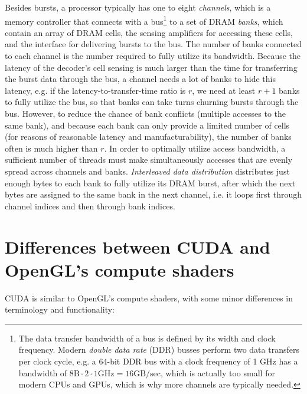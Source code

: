 \documentclass[table, xcdraw]{article}%
\begin{document}
Besides bursts, a processor typically has one to eight \emph{channels}, which is a memory controller that connects with a bus\footnote{The data transfer bandwidth of a bus is defined by its width and clock frequency. Modern \emph{double data rate} (DDR) busses perform two data transfers per clock cycle, e.g. a  64-bit DDR bus with a clock frequency of 1 GHz has a bandwidth of $8\text{B} \cdot 2 \cdot 1\text{GHz} = 16\text{GB/sec}$, which is actually too small for modern CPUs and GPUs, which is why more channels are typically needed.} to a set of DRAM \emph{banks}, which contain an array of DRAM cells, the sensing amplifiers for accessing these cells, and the interface for delivering bursts to the bus. The number of banks connected to each channel is the number required to fully utilize its bandwidth. Because the latency of the decoder's cell sensing is much larger than the time for transferring the burst data through the bus, a channel needs a lot of banks to hide this latency, e.g. if the latency-to-transfer-time ratio is $r$, we need at least $r+1$ banks to fully utilize the bus, so that banks can take turns churning bursts through the bus. However, to reduce the chance of bank conflicts (multiple accesses to the same bank), and because each bank can only provide a limited number of cells (for reasons of reasonable latency and manufacturability), the number of banks often is much higher than $r$. In order to optimally utilize access bandwidth, a sufficient number of threads must make simultaneously accesses that are evenly spread across channels and banks. \emph{Interleaved data distribution} distributes just enough bytes to each bank to fully utilize its DRAM burst, after which the next bytes are assigned to the same bank in the next channel, i.e. it loops first through channel indices and then through bank indices.

\section{Differences between CUDA and OpenGL's compute shaders}

CUDA is similar to OpenGL's compute shaders, with some minor differences in terminology and functionality:
\end{document}
